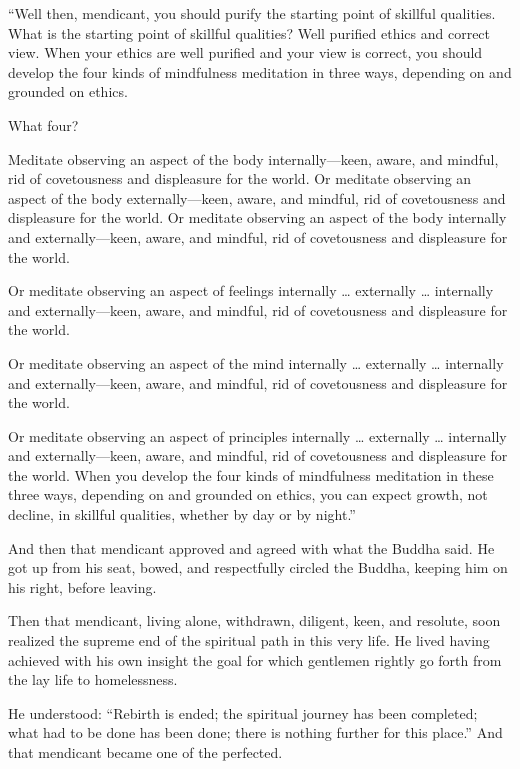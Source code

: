 \documentclass[12pt,openany]{book}%
\begin{document}
“Well then, mendicant, you should purify the starting point of skillful qualities. What is the starting point of skillful qualities? Well purified ethics and correct view. When your ethics are well purified and your view is correct, you should develop the four kinds of mindfulness meditation in three ways, depending on and grounded on ethics. 

What four? 

Meditate observing an aspect of the body internally—keen, aware, and mindful, rid of covetousness and displeasure for the world. Or meditate observing an aspect of the body externally—keen, aware, and mindful, rid of covetousness and displeasure for the world. Or meditate observing an aspect of the body internally and externally—keen, aware, and mindful, rid of covetousness and displeasure for the world. 

Or meditate observing an aspect of feelings internally … externally … internally and externally—keen, aware, and mindful, rid of covetousness and displeasure for the world. 

Or meditate observing an aspect of the mind internally … externally … internally and externally—keen, aware, and mindful, rid of covetousness and displeasure for the world. 

Or meditate observing an aspect of principles internally … externally … internally and externally—keen, aware, and mindful, rid of covetousness and displeasure for the world. When you develop the four kinds of mindfulness meditation in these three ways, depending on and grounded on ethics, you can expect growth, not decline, in skillful qualities, whether by day or by night.” 

And then that mendicant approved and agreed with what the Buddha said. He got up from his seat, bowed, and respectfully circled the Buddha, keeping him on his right, before leaving. 

Then that mendicant, living alone, withdrawn, diligent, keen, and resolute, soon realized the supreme end of the spiritual path in this very life. He lived having achieved with his own insight the goal for which gentlemen rightly go forth from the lay life to homelessness. 

He understood: “Rebirth is ended; the spiritual journey has been completed; what had to be done has been done; there is nothing further for this place.” And that mendicant became one of the perfected. 
\end{document}
